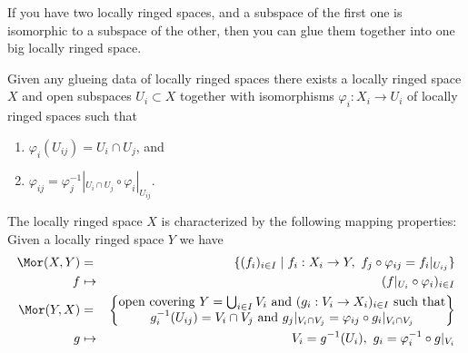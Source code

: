 \begin{lemma}
\label{lemma-glue}
\begin{slogan}
If you have two locally ringed spaces, and a subspace of the first one
is isomorphic to a subspace of the other, then you can glue them together
into one big locally ringed space.
\end{slogan}
Given any glueing data of locally ringed spaces there
exists a locally ringed space $X$ and open subspaces
$U_i \subset X$ together with isomorphisms
$\varphi_i : X_i \to U_i$ of locally ringed spaces such that
\begin{enumerate}
\item $\varphi_i(U_{ij}) = U_i \cap U_j$, and
\item $\varphi_{ij} =
\varphi_j^{-1}|_{U_i \cap U_j} \circ \varphi_i|_{U_{ij}}$.
\end{enumerate}
The locally ringed space $X$ is characterized by the following
mapping properties: Given a locally ringed space $Y$ we have
\begin{eqnarray*}
\Mor(X, Y) & = & \{ (f_i)_{i\in I} \mid
f_i : X_i \to Y, \ f_j \circ \varphi_{ij} = f_i|_{U_{ij}}\} \\
f & \mapsto & (f|_{U_i} \circ \varphi_i)_{i \in I} \\
\Mor(Y, X) & = &
\left\{
\begin{matrix}
\text{open covering }Y = \bigcup\nolimits_{i \in I} V_i\text{ and }
(g_i : V_i \to X_i)_{i \in I}
\text{ such that}\\
g_i^{-1}(U_{ij}) = V_i \cap V_j
\text{ and }
g_j|_{V_i \cap V_j} = \varphi_{ij} \circ g_i|_{V_i \cap V_j}
\end{matrix}
\right\} \\
g & \mapsto &
V_i = g^{-1}(U_i), \ g_i = \varphi_i^{-1} \circ g|_{V_i}
\end{eqnarray*}
\end{lemma}

